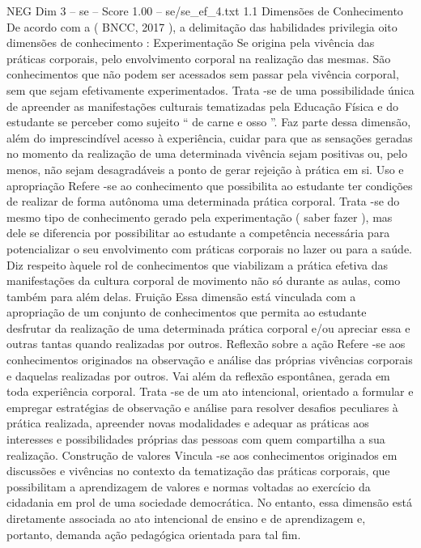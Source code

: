 \begin{textsample}{NEG Dim 3 – se – Score 1.00 – se/se\_ef\_4.txt}  \label{ex:f3_neg_122}
1.1 Dimensões de Conhecimento De acordo com a ( BNCC, 2017 ), a delimitação das habilidades privilegia oito dimensões de conhecimento : Experimentação Se origina pela vivência das práticas corporais, pelo envolvimento corporal na realização das mesmas.
São conhecimentos que não podem ser acessados sem passar pela vivência corporal, sem que sejam efetivamente experimentados.
Trata -se de uma possibilidade única de apreender as manifestações culturais tematizadas pela Educação Física e do estudante se perceber como sujeito “ de carne e osso ”.
Faz parte dessa dimensão, além do imprescindível acesso à experiência, cuidar para que as sensações geradas no momento da realização de uma determinada vivência sejam positivas ou, pelo menos, não sejam desagradáveis a ponto de gerar rejeição à prática em si.
Uso e apropriação Refere -se ao conhecimento que possibilita ao estudante ter condições de realizar de forma autônoma uma determinada prática corporal.
Trata -se do mesmo tipo de conhecimento gerado pela experimentação ( saber fazer ), mas dele se diferencia por possibilitar ao estudante a competência necessária para potencializar o seu envolvimento com práticas corporais no lazer ou para a saúde.
Diz respeito àquele rol de conhecimentos que viabilizam a prática efetiva das manifestações da cultura corporal de movimento não só durante as aulas, como também para além delas.
Fruição Essa dimensão está vinculada com a apropriação de um conjunto de conhecimentos que permita ao estudante desfrutar da realização de uma determinada prática corporal e/ou apreciar essa e outras tantas quando realizadas por outros.
Reflexão sobre a ação Refere -se aos conhecimentos originados na observação e análise das próprias vivências corporais e daquelas realizadas por outros.
Vai além da reflexão espontânea, gerada em toda experiência corporal.
Trata -se de um ato intencional, orientado a formular e empregar estratégias de observação e análise para resolver desafios peculiares à prática realizada, apreender novas modalidades e adequar as práticas aos interesses e possibilidades próprias das pessoas com quem compartilha a sua realização.
Construção de valores Vincula -se aos conhecimentos originados em discussões e vivências no contexto da tematização das práticas corporais, que possibilitam a aprendizagem de valores e normas voltadas ao exercício da cidadania em prol de uma sociedade democrática.
No entanto, essa dimensão está diretamente associada ao ato intencional de ensino e de aprendizagem e, portanto, demanda ação pedagógica orientada para tal fim.

\end{textsample}
